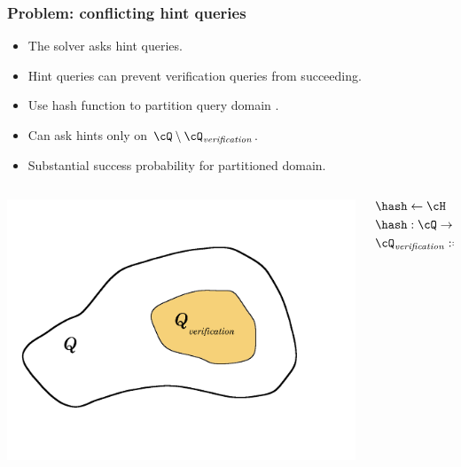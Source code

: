 \documentclass[first, handout,notes]{ETHclass}
\begin{document}
\begin{frame}[t]
  \frametitle{Problem: conflicting hint queries}
  \begin{itemize}
    \item The solver asks hint queries.
    \item Hint queries can prevent verification queries from succeeding.
    \item Use hash function to partition query domain \cite{dodis2009security}.
    \item Can ask hints only on $\cQ \setminus \cQ_{\mathit{verification}}$.
    \item Substantial success probability for partitioned domain.
  \end{itemize}
  \begin{columns}
    \begin{column}{.4\textwidth}
      \includegraphics[scale=0.08]{images/hashSets.pdf}
    \end{column}
    \begin{column}{.4\textwidth}
      \begin{align*}
        &\hash \leftarrow \cH \\
        &\hash : \cQ \rightarrow \{0,1,\dots, 2(h+v) - 1\} \\
        &\cQ_{\mathit{verification}} := {q \in \cQ : hash(q) = 0}
      \end{align*}
    \end{column}
  \end{columns}
\end{frame}
\end{document}
